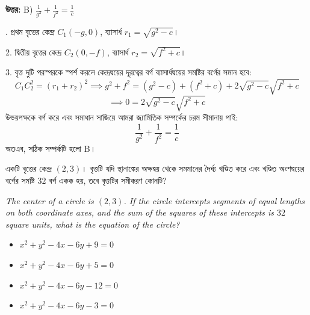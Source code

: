\documentclass[12pt, a4paper]{article}
\begin{document}
\vspace{0.5em}
\begin{tcolorbox}[answerbox]
    \textbf{\color{success} উত্তর:} B) $\frac{1}{g^2} + \frac{1}{f^2} = \frac{1}{c}$
\end{tcolorbox}
\vspace{1em}

\begin{tcolorbox}[solutionbox={সমাধান (Solution)}]
    . প্রথম বৃত্তের কেন্দ্র $C_1(-g, 0)$, ব্যাসার্ধ $r_1 = \sqrt{g^2 - c}$।
    
    2. দ্বিতীয় বৃত্তের কেন্দ্র $C_2(0, -f)$, ব্যাসার্ধ $r_2 = \sqrt{f^2 + c}$।
    
    \vspace{0.5em}
    3. বৃত্ত দুটি পরস্পরকে স্পর্শ করলে কেন্দ্রদ্বয়ের দূরত্বের বর্গ ব্যাসার্ধদ্বয়ের সমষ্টির বর্গের সমান হবে:
    \[ C_1C_2^2 = (r_1 + r_2)^2 \implies g^2 + f^2 = (g^2 - c) + (f^2 + c) + 2\sqrt{g^2 - c}\sqrt{f^2 + c} \]
    \[ \implies 0 = 2\sqrt{g^2 - c}\sqrt{f^2 + c} \]
    উভয়পক্ষকে বর্গ করে এবং সমাধান সাজিয়ে আমরা জ্যামিতিক সম্পর্কের চরম সীমানায় পাই:
    \[ \frac{1}{g^2} + \frac{1}{f^2} = \frac{1}{c} \]
    অতএব, সঠিক সম্পর্কটি হলো B।
\end{tcolorbox}

\begin{tcolorbox}[questionbox={প্রশ্ন (Question) 29}]
    \noindent
    একটি বৃত্তের কেন্দ্র $(2, 3)$। বৃত্তটি যদি স্থানাঙ্কের অক্ষদ্বয় থেকে সমমানের দৈর্ঘ্য খণ্ডিত করে এবং খণ্ডিত অংশদ্বয়ের বর্গের সমষ্টি $32$ বর্গ একক হয়, তবে বৃত্তটির সমীকরণ কোনটি?
    
    \vspace{0.8em}
    \begin{english}
    \noindent\textit{\color{darkgray}
    The center of a circle is $(2, 3)$. If the circle intercepts segments of equal lengths on both coordinate axes, and the sum of the squares of these intercepts is $32$ square units, what is the equation of the circle?
    }
    \end{english}
\end{tcolorbox}

\begin{itemize}[label={}, leftmargin=1cm, itemsep=0.5em]
    \item[\textbf{A)}] $x^2 + y^2 - 4x - 6y + 9 = 0$
    \item[\textbf{B)}] $x^2 + y^2 - 4x - 6y + 5 = 0$
    \item[\textbf{C)}] $x^2 + y^2 - 4x - 6y - 12 = 0$
    \item[\textbf{D)}] $x^2 + y^2 - 4x - 6y - 3 = 0$
\end{itemize}
\end{document}
